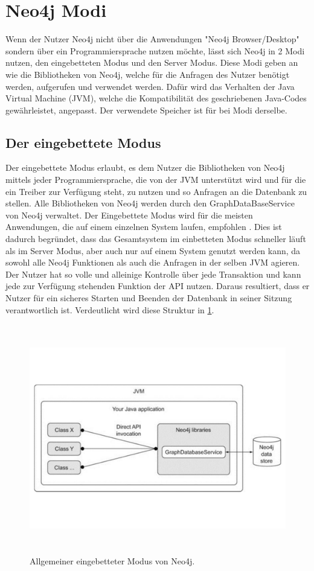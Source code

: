 \section {Neo4j Modi}
Wenn der Nutzer Neo4j nicht über die Anwendungen "Neo4j Browser/Desktop" sondern über ein Programmiersprache nutzen möchte,  lässt sich Neo4j in 2 Modi nutzen, den eingebetteten Modus und den Server Modus. Diese Modi geben an wie die Bibliotheken von Neo4j, welche für die Anfragen des Nutzer benötigt werden, aufgerufen und verwendet werden. Dafür wird das Verhalten der Java Virtual Machine (JVM), welche die Kompatibilität des geschriebenen Java-Codes gewährleistet, angepasst. Der verwendete Speicher ist für bei Modi derselbe.

\subsection{Der eingebettete Modus}
Der eingebettete Modus erlaubt, es dem Nutzer die  Bibliotheken von Neo4j mittels jeder Programmiersprache, die von der JVM unterstützt wird und für die ein Treiber zur Verfügung steht, zu nutzen und so Anfragen an die Datenbank zu stellen. Alle Bibliotheken von Neo4j werden durch den GraphDataBaseService von Neo4j verwaltet. Der Eingebettete Modus wird für die meisten Anwendungen, die auf einem einzelnen System laufen, empfohlen \parencite{raj2015neo4j}. Dies ist dadurch begründet, dass das Gesamtsystem im einbetteten Modus schneller läuft als im Server Modus, aber auch nur auf einem System genutzt werden kann, da sowohl alle Neo4j Funktionen als auch die Anfragen in der selben JVM agieren. Der Nutzer hat so volle und alleinige Kontrolle über jede Transaktion und kann jede zur Verfügung stehenden Funktion der API nutzen. Daraus resultiert, dass er Nutzer für ein sicheres Starten und Beenden der Datenbank in seiner Sitzung verantwortlich ist\parencite{robinson2013graph}.  Verdeutlicht wird diese Struktur in \ref{fig:Embedded}.
\begin{figure}[!htb]
	\centering
	\includegraphics [width=12cm, height=10cm]{Figures/Embedded}
	\caption[Eingebettet]{Allgemeiner eingebetteter Modus von Neo4j.}
	\label{fig:Embedded}
	\FloatBarrier
\end{figure}

